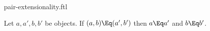 \documentclass{stex}
\begin{document}
\begin{smodule}{pair-extensionality.ftl}


\begin{fakeforthel}
  \begin{axiom}
    Let $a,a',b,b'$ be objects.
    If $(a, b) \Eq (a', b')$ then $a \Eq a'$ and $b \Eq b'$.
  \end{axiom}
\end{fakeforthel}

\end{smodule}
\end{document}
